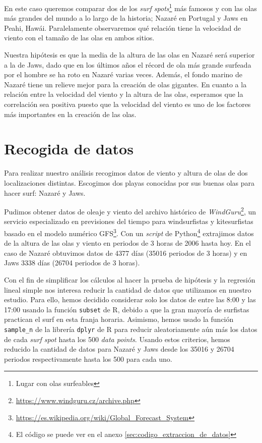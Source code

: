 En este caso queremos comparar dos de los \textit{surf spots}\footnote{Lugar con olas surfeables} más famosos y con las olas más grandes del mundo a lo largo de la historia; Nazaré en Portugal y Jaws en Peahi, Hawái. Paralelamente observaremos qué relación tiene la velocidad de viento con el tamaño de las olas en ambos sitios.

Nuestra hipótesis es que la media de la altura de las olas en Nazaré será superior a la de Jaws, dado que en los últimos años el récord de ola más grande surfeada por el hombre se ha roto en Nazaré varias veces. Además, el fondo marino de Nazaré tiene un relieve mejor para la creación de olas gigantes. En cuanto a la relación entre la velocidad del viento y la altura de las olas, esperamos que la correlación sea positiva
puesto que la velocidad del viento es uno de los factores más importantes en la creación de las olas.

\section{Recogida de datos}%
\label{sec:recogida_de_datos}
Para realizar nuestro análisis recogimos datos de viento y altura de olas de
dos localizaciones distintas. Escogimos dos playas conocidas por sus buenas
olas para hacer surf: Nazaré y Jaws.

Pudimos obtener datos de oleaje y viento del archivo histórico de \emph{WindGuru}\footnote{\url{https://www.windguru.cz/archive.php}}, un servicio especializado en previsiones del tiempo para windsurfistas y kitesurfistas basado en el modelo numérico GFS\footnote{\url{https://es.wikipedia.org/wiki/Global_Forecast_System}}. Con un \textit{script} de
Python\footnote{El código se puede ver en el anexo
  \ref{sec:codigo_extraccion_de_datos}} extrajimos datos de la altura de las
olas y viento en periodos de 3 horas de 2006 hasta hoy. En el caso de Nazaré
obtuvimos datos de 4377 días (35016 periodos de 3 horas) y en Jaws 3338 días
(26704 periodos de 3 horas).

Con el fin de simplificar los cálculos al hacer la prueba de hipótesis y la regresión lineal simple nos interesa reducir la cantidad de datos que utilizamos en nuestro estudio. Para ello, hemos decidido considerar solo los datos de entre las 8:00 y las 17:00 usando la función \texttt{subset} de R, debido a que la gran mayoría de surfistas practican el surf en esta franja horaria. Asimismo, hemos usado la función \texttt{sample\_n} de la librería \texttt{dplyr} de R para reducir aleatoriamente aún más los datos de cada \textit{surf spot} hasta los 500 \textit{data points}. Usando estos criterios, hemos reducido la cantidad de datos para Nazaré y Jaws desde los 35016 y 26704 periodos respectivamente hasta los 500 para cada uno.

